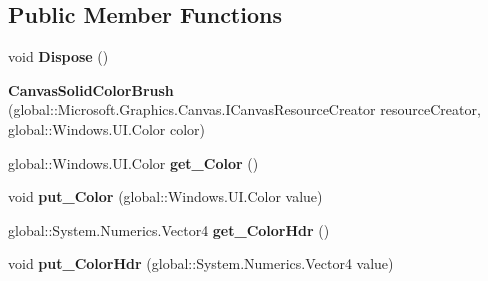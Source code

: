 \subsection*{Public Member Functions}
\begin{DoxyCompactItemize}
\item 
\mbox{\label{class_microsoft_1_1_graphics_1_1_canvas_1_1_brushes_1_1_canvas_solid_color_brush_a46f1e2e21dc08f8da7c1a89fd59311fc}} 
void {\bfseries Dispose} ()
\item 
\mbox{\label{class_microsoft_1_1_graphics_1_1_canvas_1_1_brushes_1_1_canvas_solid_color_brush_a6a9cfff8962b0007c46d54d3d60cd93f}} 
{\bfseries Canvas\+Solid\+Color\+Brush} (global\+::\+Microsoft.\+Graphics.\+Canvas.\+I\+Canvas\+Resource\+Creator resource\+Creator, global\+::\+Windows.\+U\+I.\+Color color)
\item 
\mbox{\label{class_microsoft_1_1_graphics_1_1_canvas_1_1_brushes_1_1_canvas_solid_color_brush_ac3b79256cdb5b26bcce81d701c5d722a}} 
global\+::\+Windows.\+U\+I.\+Color {\bfseries get\+\_\+\+Color} ()
\item 
\mbox{\label{class_microsoft_1_1_graphics_1_1_canvas_1_1_brushes_1_1_canvas_solid_color_brush_aa06a0ab02b8270177161c16f123f8c50}} 
void {\bfseries put\+\_\+\+Color} (global\+::\+Windows.\+U\+I.\+Color value)
\item 
\mbox{\label{class_microsoft_1_1_graphics_1_1_canvas_1_1_brushes_1_1_canvas_solid_color_brush_a9bcb646ebe3917306b5c7b2ce19e680c}} 
global\+::\+System.\+Numerics.\+Vector4 {\bfseries get\+\_\+\+Color\+Hdr} ()
\item 
\mbox{\label{class_microsoft_1_1_graphics_1_1_canvas_1_1_brushes_1_1_canvas_solid_color_brush_adb106fa11eb5a9793fe66e8d8017ce59}} 
void {\bfseries put\+\_\+\+Color\+Hdr} (global\+::\+System.\+Numerics.\+Vector4 value)

\end{DoxyCompactItemize}

